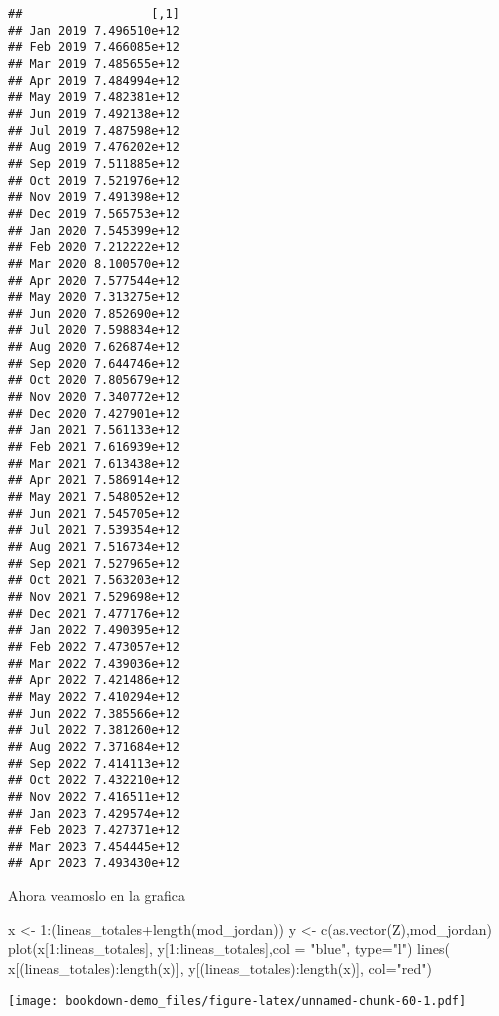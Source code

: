 \documentclass[
]{book}
\newenvironment{Shaded}{\begin{snugshade}}{\end{snugshade}}
\newcommand{\AttributeTok}[1]{\textcolor[rgb]{0.77,0.63,0.00}{#1}}
\newcommand{\DecValTok}[1]{\textcolor[rgb]{0.00,0.00,0.81}{#1}}
\newcommand{\FunctionTok}[1]{\textcolor[rgb]{0.00,0.00,0.00}{#1}}
\newcommand{\NormalTok}[1]{#1}
\newcommand{\OtherTok}[1]{\textcolor[rgb]{0.56,0.35,0.01}{#1}}
\newcommand{\SpecialCharTok}[1]{\textcolor[rgb]{0.00,0.00,0.00}{#1}}
\newcommand{\StringTok}[1]{\textcolor[rgb]{0.31,0.60,0.02}{#1}}
\begin{document}
\begin{verbatim}
##                  [,1]
## Jan 2019 7.496510e+12
## Feb 2019 7.466085e+12
## Mar 2019 7.485655e+12
## Apr 2019 7.484994e+12
## May 2019 7.482381e+12
## Jun 2019 7.492138e+12
## Jul 2019 7.487598e+12
## Aug 2019 7.476202e+12
## Sep 2019 7.511885e+12
## Oct 2019 7.521976e+12
## Nov 2019 7.491398e+12
## Dec 2019 7.565753e+12
## Jan 2020 7.545399e+12
## Feb 2020 7.212222e+12
## Mar 2020 8.100570e+12
## Apr 2020 7.577544e+12
## May 2020 7.313275e+12
## Jun 2020 7.852690e+12
## Jul 2020 7.598834e+12
## Aug 2020 7.626874e+12
## Sep 2020 7.644746e+12
## Oct 2020 7.805679e+12
## Nov 2020 7.340772e+12
## Dec 2020 7.427901e+12
## Jan 2021 7.561133e+12
## Feb 2021 7.616939e+12
## Mar 2021 7.613438e+12
## Apr 2021 7.586914e+12
## May 2021 7.548052e+12
## Jun 2021 7.545705e+12
## Jul 2021 7.539354e+12
## Aug 2021 7.516734e+12
## Sep 2021 7.527965e+12
## Oct 2021 7.563203e+12
## Nov 2021 7.529698e+12
## Dec 2021 7.477176e+12
## Jan 2022 7.490395e+12
## Feb 2022 7.473057e+12
## Mar 2022 7.439036e+12
## Apr 2022 7.421486e+12
## May 2022 7.410294e+12
## Jun 2022 7.385566e+12
## Jul 2022 7.381260e+12
## Aug 2022 7.371684e+12
## Sep 2022 7.414113e+12
## Oct 2022 7.432210e+12
## Nov 2022 7.416511e+12
## Jan 2023 7.429574e+12
## Feb 2023 7.427371e+12
## Mar 2023 7.454445e+12
## Apr 2023 7.493430e+12
\end{verbatim}

Ahora veamoslo en la grafica

\begin{Shaded}
\begin{Highlighting}[]
\NormalTok{x }\OtherTok{\textless{}{-}} \DecValTok{1}\SpecialCharTok{:}\NormalTok{(lineas\_totales}\SpecialCharTok{+}\FunctionTok{length}\NormalTok{(mod\_jordan))}
\NormalTok{y }\OtherTok{\textless{}{-}} \FunctionTok{c}\NormalTok{(}\FunctionTok{as.vector}\NormalTok{(Z),mod\_jordan)}
\FunctionTok{plot}\NormalTok{(x[}\DecValTok{1}\SpecialCharTok{:}\NormalTok{lineas\_totales], y[}\DecValTok{1}\SpecialCharTok{:}\NormalTok{lineas\_totales],}\AttributeTok{col =} \StringTok{"blue"}\NormalTok{, }\AttributeTok{type=}\StringTok{"l"}\NormalTok{)}
\FunctionTok{lines}\NormalTok{( x[(lineas\_totales)}\SpecialCharTok{:}\FunctionTok{length}\NormalTok{(x)], y[(lineas\_totales)}\SpecialCharTok{:}\FunctionTok{length}\NormalTok{(x)], }\AttributeTok{col=}\StringTok{"red"}\NormalTok{)}
\end{Highlighting}
\end{Shaded}

\texttt{[image: bookdown-demo\_files/figure-latex/unnamed-chunk-60-1.pdf]}

  
\end{document}
